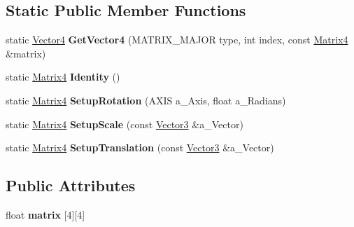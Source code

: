 \subsection*{Static Public Member Functions}
\begin{DoxyCompactItemize}
\item 
\hypertarget{class_ai_math_1_1_matrix4_a3654f5f9ad8e7e8f7e6a0a817a0dcd39}{static \hyperlink{class_ai_math_1_1_vector4}{Vector4} {\bfseries Get\+Vector4} (M\+A\+T\+R\+I\+X\+\_\+\+M\+A\+J\+O\+R type, int index, const \hyperlink{class_ai_math_1_1_matrix4}{Matrix4} \&matrix)}\label{class_ai_math_1_1_matrix4_a3654f5f9ad8e7e8f7e6a0a817a0dcd39}

\item 
\hypertarget{class_ai_math_1_1_matrix4_a9ad241a9019c4847244f9c4f1421b641}{static \hyperlink{class_ai_math_1_1_matrix4}{Matrix4} {\bfseries Identity} ()}\label{class_ai_math_1_1_matrix4_a9ad241a9019c4847244f9c4f1421b641}

\item 
\hypertarget{class_ai_math_1_1_matrix4_a2de81e80302324d87005e5ebffeabc2a}{static \hyperlink{class_ai_math_1_1_matrix4}{Matrix4} {\bfseries Setup\+Rotation} (A\+X\+I\+S a\+\_\+\+Axis, float a\+\_\+\+Radians)}\label{class_ai_math_1_1_matrix4_a2de81e80302324d87005e5ebffeabc2a}

\item 
\hypertarget{class_ai_math_1_1_matrix4_a3d06367fd6ebfed8a4b9cae3190df9f3}{static \hyperlink{class_ai_math_1_1_matrix4}{Matrix4} {\bfseries Setup\+Scale} (const \hyperlink{class_ai_math_1_1_vector3}{Vector3} \&a\+\_\+\+Vector)}\label{class_ai_math_1_1_matrix4_a3d06367fd6ebfed8a4b9cae3190df9f3}

\item 
\hypertarget{class_ai_math_1_1_matrix4_a71d3a146db94e40dc4212fa8ed0078ef}{static \hyperlink{class_ai_math_1_1_matrix4}{Matrix4} {\bfseries Setup\+Translation} (const \hyperlink{class_ai_math_1_1_vector3}{Vector3} \&a\+\_\+\+Vector)}\label{class_ai_math_1_1_matrix4_a71d3a146db94e40dc4212fa8ed0078ef}

\end{DoxyCompactItemize}
\subsection*{Public Attributes}
\begin{DoxyCompactItemize}
\item 
\hypertarget{class_ai_math_1_1_matrix4_a44a83696681798a7b3dded3d3e559157}{float {\bfseries matrix} \mbox{[}4\mbox{]}\mbox{[}4\mbox{]}}\label{class_ai_math_1_1_matrix4_a44a83696681798a7b3dded3d3e559157}

\end{DoxyCompactItemize}
